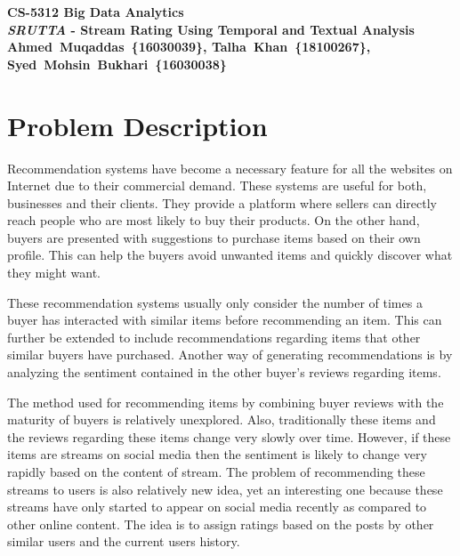 \documentclass[11pt]{article}
\begin{document}
	{
		\begin{center}
			{\LARGE \bf CS-5312 Big Data Analytics}\\
			{ \Large \bf {\itshape SRUTTA} - Stream Rating Using Temporal and Textual Analysis}\\ 
			{\large \bf \mbox{Ahmed Muqaddas \{16030039\}}, \mbox{Talha Khan \{18100267\}}, \mbox{Syed Mohsin Bukhari \{16030038\}}}
		\end{center}
	}


\section{Problem Description}

\par
Recommendation systems have become a necessary feature for all the websites on Internet due to their commercial demand. These systems are useful for both, businesses and their clients. They provide a platform where sellers can directly reach people who are most likely to buy their products. On the other hand, buyers are presented with suggestions to purchase items based on their own profile. This can help the buyers avoid unwanted items and quickly discover what they might want.
\par
These recommendation systems usually only consider the number of times a buyer has interacted with similar items before recommending an item. This can further be extended to include recommendations regarding items that other similar buyers have purchased. Another way of generating recommendations is by analyzing the sentiment contained in the other buyer's reviews regarding items.
\par
The method used for recommending items by combining buyer reviews with the maturity of buyers is relatively unexplored. Also, traditionally these items and the reviews regarding these items change very slowly over time. However, if these items are streams on social media then the sentiment is likely to change very rapidly based on the content of stream. The problem of recommending these streams to users is also relatively new idea, yet an interesting one because these streams have only started to appear on social media recently as compared to other online content. The idea is to assign ratings based on the posts by other similar users and the current users history.
\end{document}
